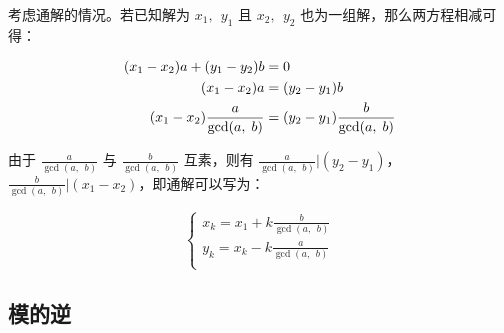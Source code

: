 \documentclass[a4paper]{article}         %
\begin{document}


考虑通解的情况。若已知解为 $x_1, \phantom{;} y_1$ 且 $x_2, \phantom{;} y_2$ 也为一组解，那么两方程相减可得：

\begin{equation}
    \begin{aligned} \notag
        (x_1 - x_2)a + (y_1 - y_2)b & = 0 \\
        (x_1 - x_2)a & = (y_2 - y_1)b \\
        (x_1 - x_2) \frac{a}{\gcd(a, \phantom{;} b)} & = (y_2 - y_1) \frac{b}{\gcd(a, \phantom{;} b)} \\
    \end{aligned}
\end{equation}

由于 $\frac{a}{\gcd(a, \phantom{;} b)}$ 与 $\frac{b}{\gcd(a, \phantom{;} b)}$ 互素，则有 $\frac{a}{\gcd(a, \phantom{;} b)} \vert (y_2 - y_1)$，$\frac{b}{\gcd(a, \phantom{;} b)} \vert (x_1 - x_2)$，即通解可以写为：

\begin{equation}
    \begin{cases}
        x_k = x_1 + k \frac{b}{\gcd(a, \phantom{;} b)} \\
        y_k = x_k - k \frac{a}{\gcd(a, \phantom{;} b)} \\
    \end{cases}
\end{equation}
\subsection{模的逆}


\end{document}

